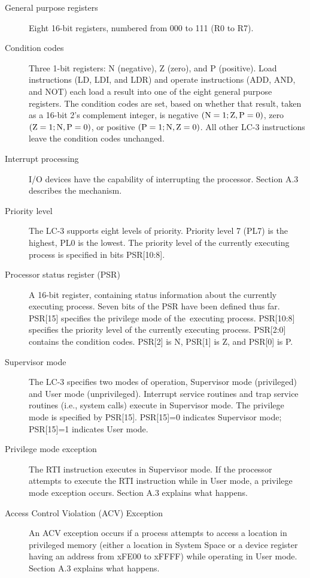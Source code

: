 \documentclass{patt}
\begin{document}
\begin{description}
\item[General purpose registers]
Eight 16-bit registers, numbered from 000 to 111 (R0 to R7).

\item[Condition codes] Three 1-bit registers: N (negative),
Z (zero), and P (positive). Load instructions (LD, LDI, and LDR)
and operate instructions (ADD, AND, and NOT) each load a
result into one of the eight general purpose registers. The
condition codes are set, based on whether that result, taken as a
16-bit 2's complement integer, is negative $({\rm N}=1;{\rm
Z},{\rm P}=0)$, zero $({\rm Z}=1;{\rm N},{\rm P}=0)$, or positive
$({\rm P}=1; {\rm N},{\rm Z}=0)$. All other LC-3 instructions
leave the condition codes unchanged.

\item[Interrupt processing] I/O devices have the
capability of interrupting the processor. Section A.3
describes the mechanism.

\item[Priority level] The LC-3 supports eight levels of priority.
Priority level 7 (PL7) is the highest, PL0 is the lowest. The priority level
of the currently executing process is specified in bits PSR[10:8].

\item[Processor status register (PSR)] A 16-bit register, containing status
information about the currently executing process. Seven bits of the PSR have
been defined thus far. PSR[15] specifies the privilege mode of the~executing
process. PSR[10:8] specifies the priority level of the currently executing
process. PSR[2:0] contains the condition codes. PSR[2] is N, PSR[1] is Z, and
PSR[0] is P.

\item[Supervisor mode] The LC-3 specifies two modes of operation, 
Supervisor mode
(privileged) and User mode (unprivileged). Interrupt service routines and trap 
service routines (i.e., system calls) execute
in Supervisor mode. The privilege mode is specified by PSR[15]. 
PSR[15]=0 indicates Supervisor mode; PSR[15]=1 indicates User mode.

\item[Privilege mode exception] The RTI instruction executes in Supervisor mode.
If the processor attempts to execute the RTI instruction while in User mode,
a privilege mode exception occurs. Section A.3 explains what happens.

\item[Access Control Violation (ACV) Exception] An ACV exception occurs if a 
process attempts to access a location in privileged memory (either a location
in System Space or a device register having an address from xFE00 to xFFFF)
while operating in User mode.   Section A.3 explains what happens.


\end{description}
\end{document}
